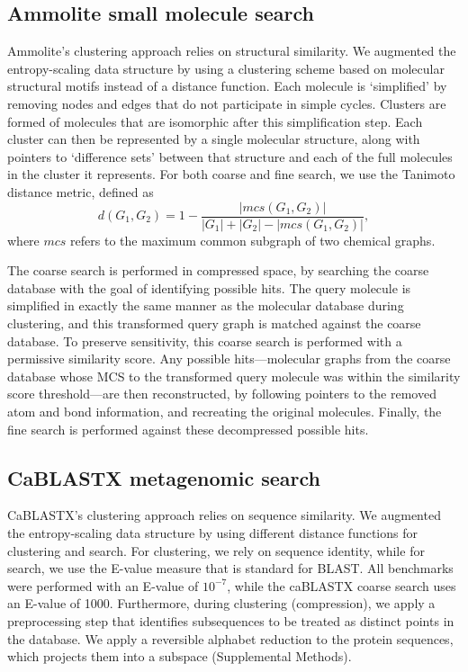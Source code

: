 \documentclass[review,preprint,12pt]{elsarticle}
\theoremstyle{definition}
\theoremstyle{remark}
\numberwithin{equation}{section}
\begin{document}
\subsection{Ammolite small molecule search}
Ammolite's clustering approach relies on structural similarity.
We augmented the entropy-scaling data structure by using a clustering scheme based on molecular structural motifs instead of a distance function.
Each molecule is `simplified' by removing nodes and edges that do not
participate in simple cycles.
Clusters are formed of molecules that are isomorphic after this simplification
step.
Each cluster can then be represented by a single molecular structure, along 
with pointers to `difference sets'  between that structure and each of the 
full molecules in the cluster it represents.
For both coarse and fine search, we use the Tanimoto distance metric, defined as
\[d(G_1,G_2) = 1 - \frac{ |mcs(G_1,G_2)| }{|G_1|+|G_2|-|mcs(G_1,G_2)|},\]
where $mcs$ refers to the maximum common subgraph of two chemical graphs. 

The coarse search is performed in compressed space, by searching 
the coarse database with the goal of identifying possible hits.
The query molecule is simplified in exactly the same manner as 
the molecular database during clustering, and this transformed query graph is 
matched against the coarse database.
To preserve sensitivity, this coarse search is performed with a permissive 
similarity score.
Any possible hits---molecular graphs from the coarse database whose MCS to 
the transformed query molecule was within the similarity score threshold---are 
then reconstructed, by following
pointers to the removed atom and bond information, and recreating the 
original molecules.
Finally, the fine search is performed against these decompressed possible 
hits.

\subsection{CaBLASTX metagenomic search}
CaBLASTX's clustering approach relies on sequence similarity.
We augmented the entropy-scaling data structure by using
different distance functions for clustering and search.
For clustering, we rely on sequence identity, while for search, we use the
E-value measure that is standard for BLAST.
All benchmarks were performed with an E-value of $10^{-7}$, while the 
caBLASTX coarse search uses an E-value of 1000.
Furthermore, during clustering (compression), we apply a preprocessing step that
identifies subsequences to be treated as distinct points in the database.
We apply a reversible alphabet reduction to the
protein sequences, which projects them into a subspace (Supplemental Methods).
\end{document}
